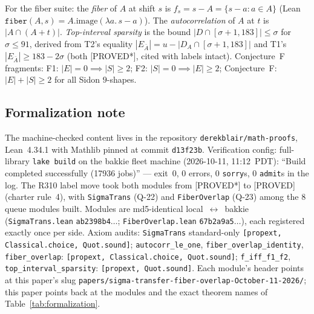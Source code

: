 \documentclass[11pt,a4paper]{article}
\theoremstyle{definition}
\begin{document}
For the fiber suite: the \emph{fiber} of $A$ at shift $s$ is
$f_s=s-A=\{s-a:a\in A\}$ (Lean
$\mathtt{fiber}(A,s)=A.\mathrm{image}(\lambda a.\,s-a)$). The
\emph{autocorrelation} of $A$ at $t$ is $|A\cap(A+t)|$.
\emph{Top-interval sparsity} is the bound $|D\cap[\sigma+1,183]|\le
\sigma$ for $\sigma\le91$, derived from T2's equality
$|E_{\bar A}|=u-|D_A\cap[\sigma+1,183]|$ and T1's $|E_{\bar A}|\ge
183-2\sigma$ (both [PROVED*], cited with labels intact). Conjecture~F
fragments: F1: $|E|=0\implies|S|\ge2$; F2: $|S|=0\implies|E|\ge2$;
Conjecture~F: $|E|+|S|\ge2$ for all Sidon $9$-shapes.

\subsection{Formalization note}
\label{sec:formalization}

The machine-checked content lives in the repository
\texttt{derekblair/math-proofs}, Lean~4.34.1 with Mathlib pinned at
commit \texttt{d13f23b}. Verification config: full-library
\texttt{lake build} on the bakkie fleet machine (2026-10-11, 11:12~PDT):
``Build completed successfully (17936 jobs)'' --- exit~$0$, $0$ errors,
$0$ \texttt{sorry}s, $0$ \texttt{admit}s in the log. The R310 label move
took both modules from [PROVED*] to [PROVED] (charter rule~4), with
\texttt{SigmaTrans} (Q-22) and \texttt{FiberOverlap} (Q-23) among the
$8$ queue modules built. Modules are md5-identical
local~$\leftrightarrow$~bakkie (\texttt{SigmaTrans.lean}
\texttt{ab2398b4$\dots$}; \texttt{FiberOverlap.lean}
\texttt{67b2a9a5$\dots$}), each registered exactly once per side. Axiom
audits: \texttt{SigmaTrans} standard-only
\texttt{[propext, Classical.choice, Quot.sound]};
\texttt{autocorr\_le\_one}, \texttt{fiber\_overlap\_identity},
\texttt{fiber\_overlap}: \texttt{[propext, Classical.choice,
Quot.sound]}; \texttt{f\_iff\_f1\_f2}, \texttt{top\_interval\_sparsity}:
\texttt{[propext, Quot.sound]}. Each module's header points at this
paper's slug
\texttt{papers/sigma-transfer-fiber-overlap-October-11-2026/}; this
paper points back at the modules and the exact theorem names of
Table~\ref{tab:formalization}.
\end{document}
